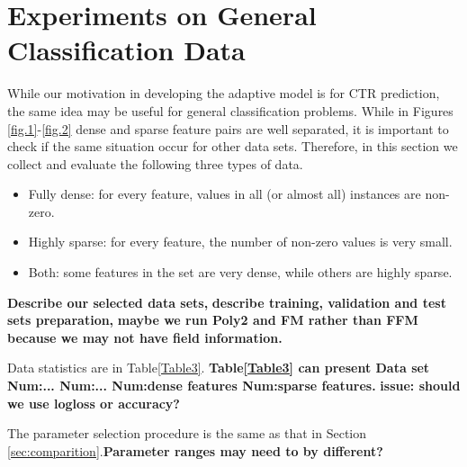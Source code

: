 \section{Experiments on General Classification Data}
While our motivation in developing the adaptive model is for CTR prediction, the same idea may be useful for general classification problems. While in Figures \ref{fig.1}-\ref{fig.2} dense and sparse feature pairs are well separated, it is important to check if the same situation occur for other data sets. Therefore, in this section we collect and evaluate the following three types of data.
\begin{itemize}
\item Fully dense: for every feature, values in all (or almost all) instances are non-zero.
\item Highly sparse: for every feature, the number of non-zero values is very small.
\item Both: some features in the set are very dense, while others are highly sparse.
\end{itemize}
{\bf Describe our selected data sets,}
{\bf describe training, validation and test sets preparation,}
{\bf maybe we run Poly2 and FM rather than FFM because we may not have field information.}

Data statistics are in Table\ref{Table3}.
{\bf Table\ref{Table3} can present Data set Num:... Num:... Num:dense features Num:sparse features.}
{\bf issue: should we use logloss or accuracy?}

The parameter selection procedure is the same as that in Section \ref{sec:comparition}.{\bf Parameter ranges may need to by different?}
